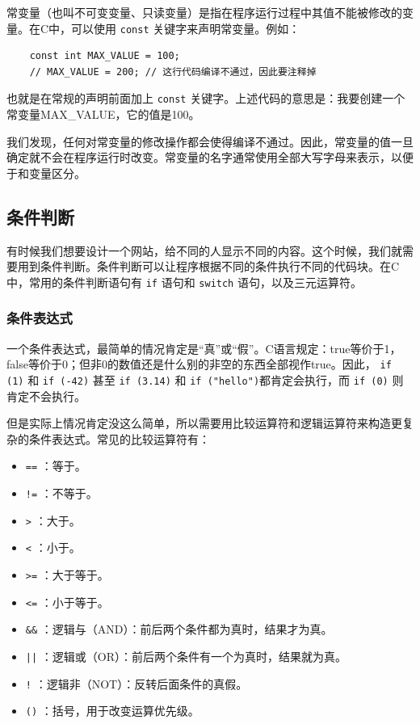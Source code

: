 常变量（也叫不可变变量、只读变量）是指在程序运行过程中其值不能被修改的变量。在C中，可以使用 \texttt{const} 关键字来声明常变量。例如：
\begin{verbatim}
    const int MAX_VALUE = 100;
    // MAX_VALUE = 200; // 这行代码编译不通过，因此要注释掉
\end{verbatim}

也就是在常规的声明前面加上 \texttt{const} 关键字。上述代码的意思是：我要创建一个常变量MAX\_VALUE，它的值是100。

我们发现，任何对常变量的修改操作都会使得编译不通过。因此，常变量的值一旦确定就不会在程序运行时改变。常变量的名字通常使用全部大写字母来表示，以便于和变量区分。

\subsection{条件判断}

有时候我们想要设计一个网站，给不同的人显示不同的内容。这个时候，我们就需要用到条件判断。条件判断可以让程序根据不同的条件执行不同的代码块。在C中，常用的条件判断语句有 \texttt{if} 语句和 \texttt{switch} 语句，以及三元运算符。

\subsubsection{条件表达式}

一个条件表达式，最简单的情况肯定是“真”或“假”。C语言规定：true等价于1，false等价于0；但非0的数值还是什么别的非空的东西全部视作true。因此， \texttt{if (1)} 和 \texttt{if (-42)} 甚至 \texttt{if (3.14)} 和 \texttt{if ("hello")}都肯定会执行，而 \texttt{if (0)} 则肯定不会执行。

但是实际上情况肯定没这么简单，所以需要用比较运算符和逻辑运算符来构造更复杂的条件表达式。常见的比较运算符有：
\begin{itemize}
  \item \texttt{==} ：等于。
  \item \texttt{!=} ：不等于。
  \item \texttt{>} ：大于。
  \item \texttt{<} ：小于。
  \item \texttt{>=} ：大于等于。
  \item \texttt{<=} ：小于等于。
  \item \texttt{\&\&} ：逻辑与（AND）：前后两个条件都为真时，结果才为真。
  \item \texttt{||} ：逻辑或（OR）：前后两个条件有一个为真时，结果就为真。
  \item \texttt{!} ：逻辑非（NOT）：反转后面条件的真假。
  \item \texttt{()} ：括号，用于改变运算优先级。
\end{itemize}

